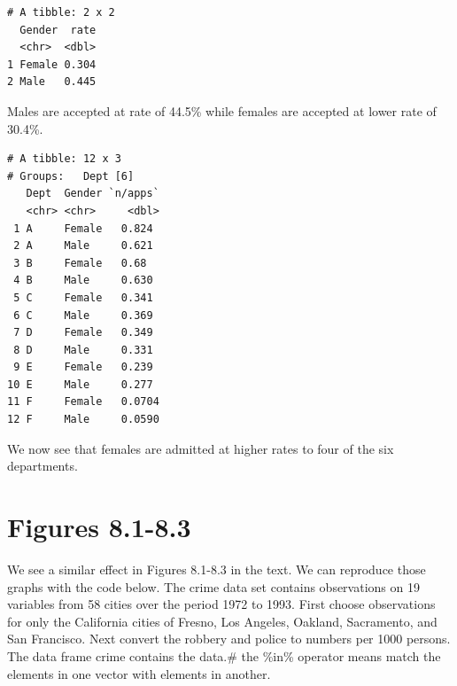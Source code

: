 \documentclass[]{book}
\newenvironment{Shaded}{\begin{snugshade}}{\end{snugshade}}
\newcommand{\DataTypeTok}[1]{\textcolor[rgb]{0.13,0.29,0.53}{#1}}
\newcommand{\KeywordTok}[1]{\textcolor[rgb]{0.13,0.29,0.53}{\textbf{#1}}}
\newcommand{\NormalTok}[1]{#1}
\newcommand{\OperatorTok}[1]{\textcolor[rgb]{0.81,0.36,0.00}{\textbf{#1}}}
\newcommand{\StringTok}[1]{\textcolor[rgb]{0.31,0.60,0.02}{#1}}
\begin{document}
\begin{verbatim}
# A tibble: 2 x 2
  Gender  rate
  <chr>  <dbl>
1 Female 0.304
2 Male   0.445
\end{verbatim}

Males are accepted at rate of 44.5\% while females are accepted at lower rate of 30.4\%.

\begin{Shaded}
\end{Shaded}

\begin{verbatim}
# A tibble: 12 x 3
# Groups:   Dept [6]
   Dept  Gender `n/apps`
   <chr> <chr>     <dbl>
 1 A     Female   0.824 
 2 A     Male     0.621 
 3 B     Female   0.68  
 4 B     Male     0.630 
 5 C     Female   0.341 
 6 C     Male     0.369 
 7 D     Female   0.349 
 8 D     Male     0.331 
 9 E     Female   0.239 
10 E     Male     0.277 
11 F     Female   0.0704
12 F     Male     0.0590
\end{verbatim}

We now see that females are admitted at higher rates to four of the six departments.

\hypertarget{figures-8.1-8.3}{%
\section{Figures 8.1-8.3}\label{figures-8.1-8.3}}

We see a similar effect in Figures 8.1-8.3 in the text. We can reproduce those graphs with the code below. The crime data set contains observations on 19 variables from 58 cities over the period 1972 to 1993. First choose observations for only the California cities of Fresno, Los Angeles, Oakland, Sacramento, and San Francisco. Next convert the robbery and police to numbers per 1000 persons. The data frame crime contains the data.\# the \%in\% operator means match the elements in one vector with elements in another.
\end{document}
